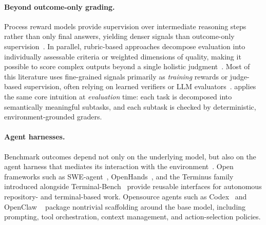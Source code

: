 \paragraph{Beyond outcome-only grading.}
Process reward models provide supervision over intermediate reasoning steps rather than only final answers, yielding denser signals than outcome-only supervision~\cite{lightman2023letsverify,khalifa2025process}.
In parallel, rubric-based approaches decompose evaluation into individually assessable criteria or weighted dimensions of quality, making it possible to score complex outputs beyond a single holistic judgment~\cite{rao2026autorubric,pan2026rubriceval,tian2026arco}.
%
Most of this literature uses fine-grained signals primarily as \emph{training} rewards or judge-based supervision, often relying on learned verifiers or LLM evaluators~\cite{uesato2022solving,zheng2023judging,li2025self,yuan2024self}.
%
\ours{} applies the same core intuition at \emph{evaluation} time: each task is decomposed into semantically meaningful subtasks, and each subtask is checked by deterministic, environment-grounded graders.





\paragraph{Agent harnesses.}
Benchmark outcomes depend not only on the underlying model, but also on the agent harness that mediates its interaction with the environment~\cite{yao2026harness, yang2024sweagent,li2026comfyclaw,lin2026harness}. 
%
Open frameworks such as SWE-agent~\cite{yang2024sweagent}, OpenHands~\cite{wang2024openhands}, and the Terminus family introduced alongside Terminal-Bench~\cite{merrill2026terminalbenchbenchmarkingagentshard} provide reusable interfaces for autonomous repository- and terminal-based work. Opensource agents such as Codex~\cite{openai2025codex} and OpenClaw ~\cite{openclaw2026} package nontrivial scaffolding around the base model, including prompting, tool orchestration, context management, and action-selection policies. 
